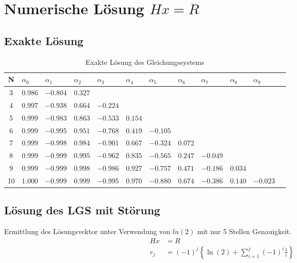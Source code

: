 \documentclass{beamer}
\begin{document}
  \section{Numerische Lösung $Hx=R$}
  \subsection{Exakte Lösung}
  \begin{frame}
    \centering    
    \begin{table}[htbp]
    \tiny   
    \renewcommand{\arraystretch}{1.5}
    \begin{tabularx}{\textwidth}{|c|X|X|X|X|X|X|X|X|X|X|X|}
        \hline    
        N & $\alpha_0$&$\alpha_1$&$\alpha_2$&$\alpha_3$&$\alpha_4$&$\alpha_5$&$\alpha_6$&$\alpha_7$&$\alpha_8$&$\alpha_9$ \\\hline
        3 & $0.986$ & $-0.804$ &  $0.327$ &&&&&&& \\\hline
        4 & $0.997$ & $-0.938$ &  $0.664$ & $-0.224$ &&&&&& \\\hline
        5 & $0.999$ & $-0.983$ &  $0.863$ & $-0.533$ &  $0.154$ &&&&& \\\hline
        6 & $0.999$ & $-0.995$ &  $0.951$ & $-0.768$ &  $0.419$ & $-0.105$ &&&& \\\hline
        7 & $0.999$ & $-0.998$ &  $0.984$ & $-0.901$ &  $0.667$ & $-0.324$ &  $0.072$ &&& \\\hline
        8 & $0.999$ & $-0.999$ &  $0.995$ & $-0.962$ &  $0.835$ & $-0.565$ &  $0.247$ & $-0.049$ && \\\hline
        9 & $0.999$ & $-0.999$ &  $0.998$ & $-0.986$ &  $0.927$ & $-0.757$ &  $0.471$ & $-0.186$ &  $0.034$ & \\\hline
        10 & $1.000$ & $-0.999$ &  $0.999$ & $-0.995$ &  $0.970$ & $-0.880$ &  $0.674$ & $-0.386$ &  $0.140$ & $-0.023$  \\\hline
    \end{tabularx}
    \caption{Exakte Lösung des Gleichungssystems}      
    \end{table}
  \end{frame}
  
  \subsection{Lösung des LGS mit Störung}
  \begin{frame}
    Ermittlung des Lösungsvektor unter Verwendung von $ln(2)$ mit nur 5 Stellen Genauigkeit.
    \begin{align}
      Hx&=R\\
      r_j&= (-1)^j \left\{ \ln(2) + \sum_{i=1}^j (-1)^i \frac{1}{i} \right\}
    \end{align}
   
  \end{frame}
  
\end{document}
